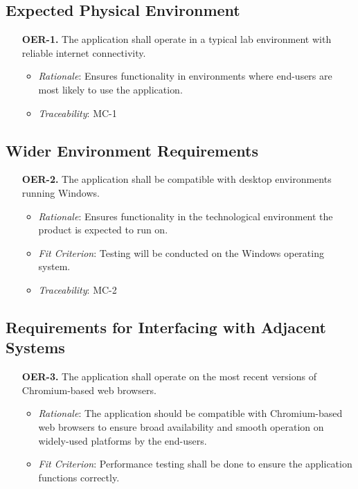 \documentclass[12pt]{article}
\begin{document}
\subsection{Expected Physical Environment}
\begin{enumerate}
  \item[\textbf{OER-1.}] The application shall operate in a typical lab environment with reliable internet connectivity.
    \begin{itemize}
      \item \textit{Rationale}: Ensures functionality in environments where end-users are most likely to use the application. 
      \item \textit{Traceability}: MC-1
    \end{itemize}
\end{enumerate}

\subsection{Wider Environment Requirements}
\begin{enumerate}
  \item[\textbf{OER-2.}] The application shall be compatible with desktop environments running Windows.
    \begin{itemize}
      \item \textit{Rationale}: Ensures functionality in the technological environment the product is expected to run on.
      \item \textit{Fit Criterion}: Testing will be conducted on the Windows operating system.
      \item \textit{Traceability}: MC-2
    \end{itemize}
\end{enumerate}

\subsection{Requirements for Interfacing with Adjacent Systems}
\begin{enumerate}
  \item[\textbf{OER-3.}] The application shall operate on the most recent versions of Chromium-based web browsers.
    \begin{itemize}
      \item \textit{Rationale}: The application should be compatible with Chromium-based web browsers to ensure broad availability and smooth operation on widely-used platforms by the end-users.
      \item \textit{Fit Criterion}: Performance testing shall be done to ensure the application functions correctly.
    \end{itemize}
\end{enumerate}
\end{document}
